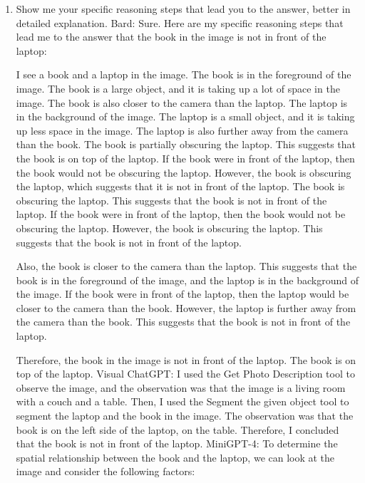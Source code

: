 \begin{enumerate}
    Therefore, the book in the image is not in front of the laptop. The book is on top of the laptop.
    \subitem Visual ChatGPT: The book is not in front of the laptop, it is on the left side of the laptop, on the table.
    \subitem MiniGPT-4: No, the book is on a coffee table next to the couch, while the laptop is on a desk in the corner of the room.
    \item Show me your specific reasoning steps that lead you to the answer, better in detailed explanation.
    \subitem Bard: Sure. Here are my specific reasoning steps that lead me to the answer that the book in the image is not in front of the laptop:

    I see a book and a laptop in the image.
    The book is in the foreground of the image. The book is a large object, and it is taking up a lot of space in the image. The book is also closer to the camera than the laptop.
    The laptop is in the background of the image. The laptop is a small object, and it is taking up less space in the image. The laptop is also further away from the camera than the book.
    The book is partially obscuring the laptop. This suggests that the book is on top of the laptop.
    If the book were in front of the laptop, then the book would not be obscuring the laptop. However, the book is obscuring the laptop, which suggests that it is not in front of the laptop.
    The book is obscuring the laptop. This suggests that the book is not in front of the laptop. If the book were in front of the laptop, then the book would not be obscuring the laptop. However, the book is obscuring the laptop. This suggests that the book is not in front of the laptop.
    
    Also, the book is closer to the camera than the laptop. This suggests that the book is in the foreground of the image, and the laptop is in the background of the image. If the book were in front of the laptop, then the laptop would be closer to the camera than the book. However, the laptop is further away from the camera than the book. This suggests that the book is not in front of the laptop.
    
    Therefore, the book in the image is not in front of the laptop. The book is on top of the laptop.
    \subitem Visual ChatGPT: I used the Get Photo Description tool to observe the image, and the observation was that the image is a living room with a couch and a table. Then, I used the Segment the given object tool to segment the laptop and the book in the image. The observation was that the book is on the left side of the laptop, on the table. Therefore, I concluded that the book is not in front of the laptop.
    \subitem MiniGPT-4: To determine the spatial relationship between the book and the laptop, we can look at the image and consider the following factors:


\end{enumerate}
